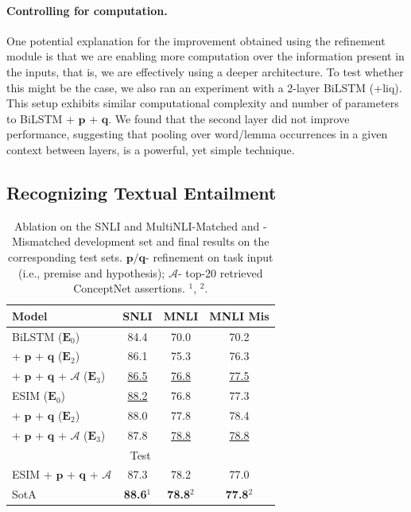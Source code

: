 \documentclass[11pt,a4paper]{article}
\begin{document}
\paragraph{Controlling for computation.} One potential explanation for the improvement obtained using the refinement module is that we are enabling more computation over the information present in the inputs, that is, we are effectively using a deeper architecture. To test whether this might be the case, we also ran an experiment with a 2-layer BiLSTM (+liq). This setup exhibits similar computational complexity and number of parameters to BiLSTM + $\boldsymbol{p}$ + $\boldsymbol{q}$. We found that the second layer did not improve performance, suggesting that pooling over word/lemma occurrences in a given context between layers, is a powerful, yet simple technique.


\subsection{Recognizing Textual Entailment}

\begin{table}[t]
    \small
    \centering
        \begin{tabular}{l c c c}
            \toprule
            \textbf{Model} & \textbf{SNLI} & \textbf{MNLI} & \textbf{MNLI Mis} \\
            \midrule  
            BiLSTM ($\mathbf{E}_0$) & 84.4 & 70.0 & 70.2 \\  
            + $\boldsymbol{p}$ + $\boldsymbol{q}$ ($\mathbf{E}_2$) & 86.1 & 75.3 & 76.3 \\  
            + $\boldsymbol{p}$ + $\boldsymbol{q}$ + $\mathcal{A}$ ($\mathbf{E}_3$) & \underline{86.5} & \underline{76.8} & \underline{77.5} \\
            \midrule
            ESIM ($\mathbf{E}_0$) & \underline{88.2} & 76.8 & 77.3 \\  
            + $\boldsymbol{p}$ + $\boldsymbol{q}$ ($\mathbf{E}_2$) & 88.0 & 77.8 & 78.4 \\   
            + $\boldsymbol{p}$ + $\boldsymbol{q}$ + $\mathcal{A}$ ($\mathbf{E}_3$) & 87.8 & \underline{78.8} & \underline{78.8} \\
            \midrule
            \multicolumn{4}{c}{Test} \\
            \midrule
            ESIM + $\boldsymbol{p}$ + $\boldsymbol{q}$ + $\mathcal{A}$ & 87.3 & 78.2 & 77.0 \\
            SotA & \textbf{88.6}$^1$ & \textbf{78.8}$^2$ & \textbf{77.8}$^2$ \\  
            \bottomrule
        \end{tabular}    
        \caption{Ablation on the SNLI and MultiNLI-Matched and -Mismatched development set and final results on the corresponding test sets. $\boldsymbol{p/q}$- refinement on task input (i.e., premise and hypothesis); $\mathcal{A}$- top-20 retrieved ConceptNet assertions. $^1$\citet{Chen2017_ESIM}, $^2$\citet{gong2017natural}.}\label{tab:rte_results}
\end{table}
\end{document}
